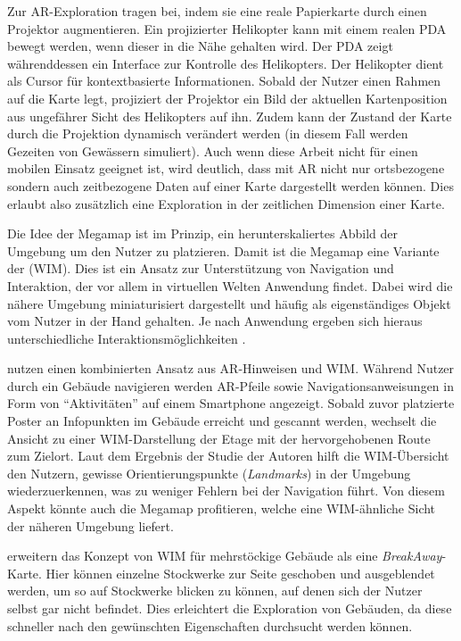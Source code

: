 Zur \gls{AR}-Exploration tragen \textcite{Reitmayr2005} bei, indem sie eine reale Papierkarte durch einen Projektor augmentieren.
Ein projizierter Helikopter kann mit einem realen \gls{PDA} bewegt werden, wenn dieser in die Nähe gehalten wird.
Der \gls{PDA} zeigt währenddessen ein Interface zur Kontrolle des Helikopters.
Der Helikopter dient als Cursor für kontextbasierte Informationen.
Sobald der Nutzer einen Rahmen auf die Karte legt, projiziert der Projektor ein Bild der aktuellen Kartenposition aus ungefährer Sicht des Helikopters auf ihn.
Zudem kann der Zustand der Karte durch die Projektion dynamisch verändert werden (in diesem Fall werden Gezeiten von Gewässern simuliert).
Auch wenn diese Arbeit nicht für einen mobilen Einsatz geeignet ist, wird deutlich, dass mit \gls{AR} nicht nur ortsbezogene sondern auch zeitbezogene Daten auf einer Karte dargestellt werden können.
Dies erlaubt also zusätzlich eine Exploration in der zeitlichen Dimension einer Karte.

Die Idee der Megamap ist im Prinzip, ein herunterskaliertes Abbild der Umgebung um den Nutzer zu platzieren.
Damit ist die Megamap eine Variante der  (\gls{WIM}).
Dies ist ein Ansatz zur Unterstützung von Navigation und Interaktion, der vor allem in virtuellen Welten Anwendung findet.
Dabei wird die nähere Umgebung miniaturisiert dargestellt und häufig als eigenständiges Objekt vom Nutzer in der Hand gehalten.
Je nach Anwendung ergeben sich hieraus unterschiedliche Interaktionsmöglichkeiten \parencite{Stoakley1995}.

\textcites{Mulloni2011a}{Mulloni2012} nutzen einen kombinierten Ansatz aus \gls{AR}-Hinweisen und \gls{WIM}.
Während Nutzer durch ein Gebäude navigieren werden \gls{AR}-Pfeile sowie Navigationsanweisungen in Form von \enquote{Aktivitäten} auf einem Smartphone angezeigt.
Sobald zuvor platzierte Poster an Infopunkten im Gebäude erreicht und gescannt werden, wechselt die Ansicht zu einer \gls{WIM}-Darstellung der Etage mit der hervorgehobenen Route zum Zielort.
Laut dem Ergebnis der Studie der Autoren hilft die \gls{WIM}-Übersicht den Nutzern, gewisse Orientierungspunkte (\emph{Landmarks}) in der Umgebung wiederzuerkennen, was zu weniger Fehlern bei der Navigation führt.
Von diesem Aspekt könnte auch die Megamap profitieren, welche eine \gls{WIM}-ähnliche Sicht der näheren Umgebung liefert.

\textcite{Chittaro2005} erweitern das Konzept von \gls{WIM} für mehrstöckige Gebäude als eine \emph{BreakAway}-Karte.
Hier können einzelne Stockwerke zur Seite geschoben und ausgeblendet werden, um so auf Stockwerke blicken zu können, auf denen sich der Nutzer selbst gar nicht befindet.
Dies erleichtert die Exploration von Gebäuden, da diese schneller nach den gewünschten Eigenschaften durchsucht werden können.

